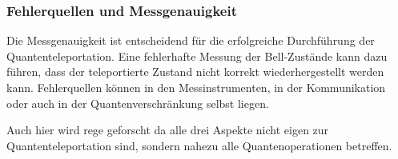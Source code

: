 \subsubsection{Fehlerquellen und Messgenauigkeit}
Die Messgenauigkeit ist entscheidend für die erfolgreiche Durchführung der Quantenteleportation.
Eine fehlerhafte Messung der Bell-Zustände kann dazu führen, dass der teleportierte Zustand nicht korrekt wiederhergestellt werden kann.
Fehlerquellen können in den Messinstrumenten, in der Kommunikation oder auch in der Quantenverschränkung selbst liegen.

Auch hier wird rege geforscht da alle drei Aspekte nicht eigen zur Quantenteleportation sind, sondern nahezu alle
Quantenoperationen betreffen.



